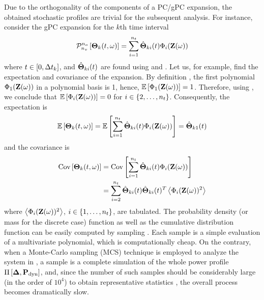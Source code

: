 Due to the orthogonality of the components of a PC/gPC expansion, the obtained stochastic profiles are trivial for the subsequent analysis. For instance, consider the gPC expansion for the $k$th time interval
\begin{equation} \elabel{pc-k}
  \oPC{\vars}{\pcorder}{\vTO_k(\t, \o)} = \sum_{i = 1}^{\pcterms} \pcc{\vTO}_{ki}(\t) \pcb_i(\vZ(\o))
\end{equation}
where $t \in [0, \Delta t_k]$, and $\hat{{\boldsymbol\Theta}}_{ki}(t)$ are found using  and . Let us, for example, find the expectation and covariance of the expansion. By definition \cite{xiu2002}, the first polynomial $\Phi_1(\mathbf{Z}(\omega))$ in a polynomial basis is 1, hence, $\mathbb{E}\left[\Phi_1(\mathbf{Z}(\omega))\right] = 1$. Therefore, using , we conclude that $\mathbb{E}\left[\Phi_i(\mathbf{Z}(\omega))\right] = 0$ for $i \in \{ 2, \dotsc, {n_t} \}$. Consequently, the expectation is
\[
  \mathbb{E}\left[{\boldsymbol\Theta}_k(t, \omega)\right] = \mathbb{E}\left[\sum_{i = 1}^{{n_t}} \hat{{\boldsymbol\Theta}}_{ki}(t) \Phi_i(\mathbf{Z}(\omega))\right] = \hat{{\boldsymbol\Theta}}_{k1}(t)
\]
and the covariance is
\begin{align*}
  \text{Cov}\left[{\boldsymbol\Theta}_k(t, \omega)\right] & = \text{Cov}\left[\sum_{i = 1}^{{n_t}} \hat{{\boldsymbol\Theta}}_{ki}(t) \Phi_i(\mathbf{Z}(\omega))\right] \\
  & = \sum_{i = 2}^{{n_t}} \hat{{\boldsymbol\Theta}}_{ki}(t) \hat{{\boldsymbol\Theta}}_{ki}(t)^T \left\langle \Phi_i(\mathbf{Z}(\omega))^2 \right\rangle
\end{align*}
where $\left\langle \Phi_i(\mathbf{Z}(\omega))^2 \right\rangle$, $i \in \{ 1, \dotsc, {n_t} \}$, are tabulated. The probability density (or mass for the discrete case) function as well as the cumulative distribution function can be easily computed by sampling . Each sample is a simple evaluation of a multivariate polynomial, which is computationally cheap. On the contrary, when a Monte-Carlo sampling (MCS) technique is employed to analyze the system in , a sample is a complete simulation of the whole power profile $\prof{\mP_\dyn}$, and, since the number of such samples should be considerably large (in the order of $10^4$) to obtain representative statistics \cite{xiu2009}, the overall process becomes dramatically slow.
